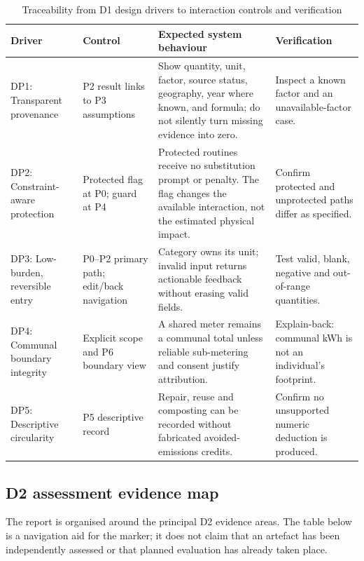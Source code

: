 \documentclass[12pt,a4paper]{article}
\begin{document}
\begin{table}[ht]
\centering
\small
\caption{Traceability from D1 design drivers to interaction controls and verification}
\label{tab:design-controls}
\footnotesize
\setlength{\emergencystretch}{1em}
\begin{tabularx}{\textwidth}{@{}>{\raggedright\arraybackslash}p{2.7cm}>{\raggedright\arraybackslash}p{2.7cm}>{\raggedright\arraybackslash}X>{\raggedright\arraybackslash}p{2.7cm}@{}}
\toprule
\textbf{Driver} & \textbf{Control} & \textbf{Expected system behaviour} & \textbf{Verification}\\
\midrule
DP1: Transparent provenance & P2 result links to P3 assumptions & Show quantity, unit, factor, source status, geography, year where known, and formula; do not silently turn missing evidence into zero. & Inspect a known factor and an unavailable-factor case.\\
\rowcolor{brandlight}
DP2: Constraint-aware protection & Protected flag at P0; guard at P4 & Protected routines receive no substitution prompt or penalty. The flag changes the available interaction, not the estimated physical impact. & Confirm protected and unprotected paths differ as specified.\\
DP3: Low-burden, reversible entry & P0--P2 primary path; edit/back navigation & Category owns its unit; invalid input returns actionable feedback without erasing valid fields. & Test valid, blank, negative and out-of-range quantities.\\
\rowcolor{brandlight}
DP4: Communal boundary integrity & Explicit scope and P6 boundary view & A shared meter remains a communal total unless reliable sub-metering and consent justify attribution. & Explain-back: communal kWh is not an individual's footprint.\\
DP5: Descriptive circularity & P5 descriptive record & Repair, reuse and composting can be recorded without fabricated avoided-emissions credits. & Confirm no unsupported numeric deduction is produced.\\
\bottomrule
\end{tabularx}
\end{table}


\subsection{D2 assessment evidence map}
The report is organised around the principal D2 evidence areas. The table below is a navigation aid for the marker; it does not claim that an artefact has been independently assessed or that planned evaluation has already taken place.
\end{document}
